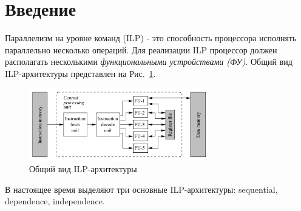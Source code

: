 \documentclass{matmex-diploma-custom}
\begin{document}

\maketitle
\tableofcontents
\section*{Введение}
Параллелизм на уровне команд (ILP) - это способность процессора исполнять параллельно несколько операций. Для реализации ILP процессор должен располагать несколькими \textit{функциональными устройствами (ФУ)}. Общий вид ILP-архитектуры представлен на Рис.~\ref{ilp}.

\begin{figure}[h]
    \centering
    \includegraphics[width=0.7\textwidth]{ilp.png}
    \caption{Общий вид ILP-архитектуры \cite{tta}}
    \label{ilp}
\end{figure}

В настоящее время выделяют три основные ILP-архитектуры: sequential, dependence, independence.
\end{document}
